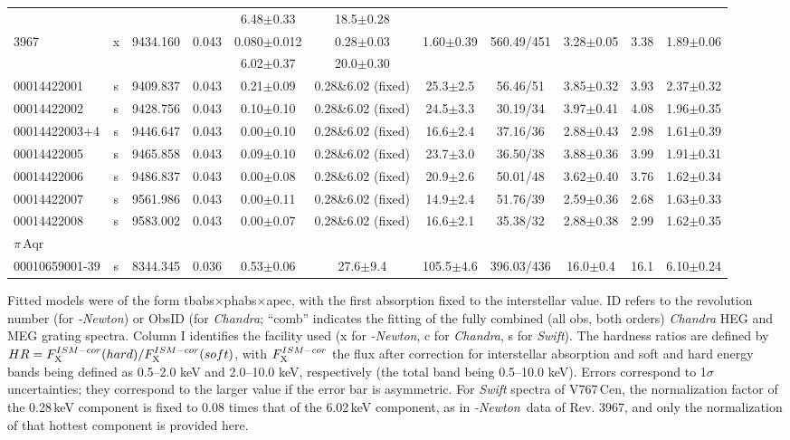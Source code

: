 \documentclass[a4paper,fleqn,usenatbib]{mnras}
\newcommand{\xmm}{{\sc{XMM}}\emph{-Newton}}
\newcommand{\vc}{V767\,Cen}
\begin{document}
\begin{table*}
\begin{tabular}{lcccccccccc}
      &         &     &               & 6.48$\pm$0.33 &18.5$\pm$0.28 \\
3967  &x&9434.160 &0.043&0.080$\pm$0.012& 0.28$\pm$0.03 &1.60$\pm$0.39 & 560.49/451 & 3.28$\pm$0.05 & 3.38 & 1.89$\pm$0.06\\
      &         &     &               & 6.02$\pm$0.37 &20.0$\pm$0.30 \\ 
00014422001  &s&9409.837 &0.043&0.21$\pm$0.09& 0.28\&6.02 (fixed)& 25.3$\pm$2.5 &56.46/51 & 3.85$\pm$0.32 &3.93 & 2.37$\pm$0.32\\
00014422002  &s&9428.756 &0.043&0.10$\pm$0.10& 0.28\&6.02 (fixed)& 24.5$\pm$3.3 &30.19/34 & 3.97$\pm$0.41 &4.08 & 1.96$\pm$0.35\\
00014422003+4&s&9446.647 &0.043&0.00$\pm$0.10& 0.28\&6.02 (fixed)& 16.6$\pm$2.4 &37.16/36 & 2.88$\pm$0.43 &2.98 & 1.61$\pm$0.39\\
00014422005  &s&9465.858 &0.043&0.09$\pm$0.10& 0.28\&6.02 (fixed)& 23.7$\pm$3.0 &36.50/38 & 3.88$\pm$0.36 &3.99 & 1.91$\pm$0.31\\
00014422006  &s&9486.837 &0.043&0.00$\pm$0.08& 0.28\&6.02 (fixed)& 20.9$\pm$2.6 &50.01/48 & 3.62$\pm$0.40 &3.76 & 1.62$\pm$0.34\\
00014422007  &s&9561.986 &0.043&0.00$\pm$0.11& 0.28\&6.02 (fixed)& 14.9$\pm$2.4 &51.76/39 & 2.59$\pm$0.36 &2.68 & 1.63$\pm$0.33\\
00014422008  &s&9583.002 &0.043&0.00$\pm$0.07& 0.28\&6.02 (fixed)& 16.6$\pm$2.1 &35.38/32 & 2.88$\pm$0.38 &2.99 & 1.62$\pm$0.35\\

\hline                                               
\multicolumn{11}{l}{$\pi$\,Aqr}\\
00010659001-39&s&8344.345 &0.036&0.53$\pm$0.06 &27.6$\pm$9.4 &105.5$\pm$4.6 &396.03/436 &16.0$\pm$0.4 &16.1 & 6.10$\pm$0.24\\
\hline
  \end{tabular}
  
{\scriptsize Fitted models were of the form tbabs$\times$phabs$\times$apec, with the first absorption fixed to the interstellar value. ID refers to the revolution number (for \xmm) or ObsID (for {\it Chandra}; ``comb'' indicates the fitting of the fully combined (all obs, both orders) {\it Chandra} HEG and MEG grating spectra. Column I identifies the facility used (x for \xmm, c for {\it Chandra}, s for {\it Swift}). The hardness ratios are defined by $HR = F_{\rm X}^{ISM-cor}(hard)/F_{\rm X}^{ISM-cor}(soft)$, with $F_{\rm X}^{ISM-cor}$ the flux after correction for interstellar absorption and soft and hard energy bands being defined as 0.5--2.0 keV and 2.0--10.0 keV, respectively (the total band being 0.5--10.0 keV). Errors correspond to 1$\sigma$ uncertainties; they correspond to the larger value if the error bar is asymmetric. For {\it Swift} spectra of \vc, the normalization factor of the 0.28\,keV component is fixed to 0.08 times that of the 6.02\,keV component, as in \xmm\ data of Rev. 3967, and only the normalization of that hottest component is provided here.}
\end{table*}
\end{document}

